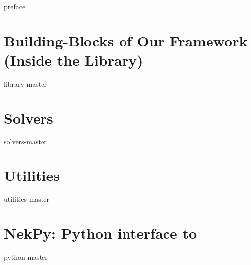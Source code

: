 {preface}


%

%

\part{Building-Blocks of Our Framework (Inside the Library)} \label{part:library}


{library-master}
\part{Solvers} \label{part:solvers}

{solvers-master}

\part{Utilities} \label{part:utilities}

{utilities-master}

\part{NekPy: Python interface to \nek{}} \label{part:nekpy}

{python-master}



 

\printindex


